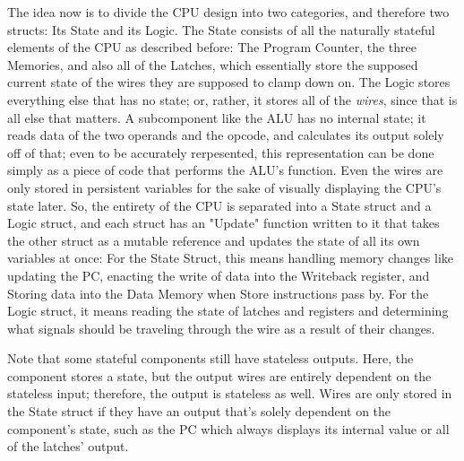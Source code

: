 \documentclass[12pt,twoside]{reedthesis}
\begin{document}
The idea now is to divide the CPU design into two categories, and therefore two structs: Its State and its Logic. The State consists of all the naturally  stateful elements of the CPU as described before: The Program Counter, the three Memories, and also all of the Latches, which essentially store the supposed current state of the wires they are supposed to clamp down on. The Logic stores everything else that has no state; or, rather, it stores all of the \textit{wires}, since that is all else that matters. A subcomponent like the ALU has no internal state; it reads data of the two operands and the opcode, and calculates its output solely off of that; even to be accurately rerpesented, this representation can be done simply as a piece of code that performs the ALU's function. Even the wires are only stored in persistent variables for the sake of visually displaying the CPU's state later. So, the entirety of the CPU is separated into a State struct and a Logic struct, and each struct has an "Update" function written to it that takes the other struct as a mutable reference and  updates the state of all its own variables at once: For the State Struct, this means handling memory changes like updating the PC, enacting the write of data into the Writeback register, and Storing data into the Data Memory when Store instructions pass by. For the Logic struct, it means reading the state of latches and registers and determining what signals should be traveling through the wire as a result of their changes.

Note that some stateful components still have stateless outputs. Here, the component stores a state, but the output wires are entirely dependent on the stateless input; therefore, the output is stateless as well. Wires are only stored in the State struct if they have an output that's solely dependent on the component's state, such as the PC which always displays its internal value or all of the latches' output.
\end{document}
